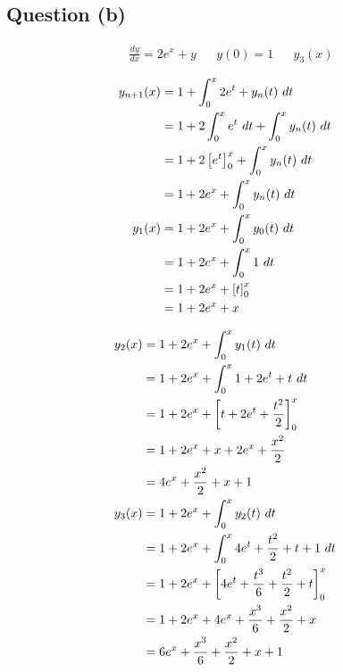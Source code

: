 	\subsection{Question (b)}
		\begin{align}
			&\frac{dy}{dx} = 2e^{x} + y&
			&y(0) = 1&
			&y_{3}(x)&
		\end{align}

		\begin{align}
			y_{n+1}(x) &= 1 + \int_{0}^{x} 2e^{t} + y_{n}(t) \ dt& \\
			&= 1 + 2\int_{0}^{x} e^{t} \ dt + \int_{0}^{x} y_{n}(t) \ dt& \notag \\
			&= 1 + 2\left[e^{t}\right]_{0}^{x} + \int_{0}^{x} y_{n}(t) \ dt& \notag \\
			&= 1 + 2e^{x} + \int_{0}^{x} y_{n}(t) \ dt& \\
			y_{1}(x) &= 1 + 2e^{x} + \int_{0}^{x} y_{0}(t) \ dt& \\
			&= 1 + 2e^{x} + \int_{0}^{x} 1 \ dt& \notag \\
			&= 1 + 2e^{x} +  \left[t\right]_{0}^{x}& \notag \\
			&= 1 + 2e^{x} + x&
		\end{align}

		\begin{align}
			y_{2}(x) &= 1 + 2e^{x} + \int_{0}^{x} y_{1}(t) \ dt& \\
			&= 1 + 2e^{x} + \int_{0}^{x} 1 + 2e^{t} + t \ dt& \notag \\
			&= 1 + 2e^{x} + \left[t + 2e^{t} + \frac{t^{2}}{2}\right]_{0}^{x}& \notag \\
			&= 1 + 2e^{x} + x + 2e^{x} + \frac{x^{2}}{2}& \notag \\
			&= 4e^{x} + \frac{x^{2}}{2} + x + 1& \\
			y_{3}(x) &= 1 + 2e^{x} + \int_{0}^{x} y_{2}(t) \ dt& \\
			&= 1 + 2e^{x} + \int_{0}^{x} 4e^{t} + \frac{t^{2}}{2} + t + 1 \ dt& \notag \\
			&= 1 + 2e^{x} + \left[4e^{t} + \frac{t^{3}}{6} + \frac{t^{2}}{2} + t\right]_{0}^{x}& \notag \\
			&= 1 + 2e^{x} + 4e^{x} + \frac{x^{3}}{6} + \frac{x^{2}}{2} + x& \notag \\
			&= 6e^{x} + \frac{x^{3}}{6} + \frac{x^{2}}{2} + x + 1&
		\end{align}
